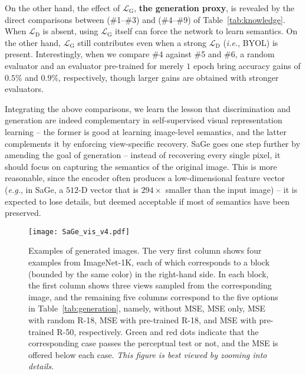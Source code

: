\documentclass[10pt,twocolumn,letterpaper]{article}
\begin{document}
On the other hand, the effect of $\mathcal{L}_\mathrm{G}$, \textbf{the generation proxy}, is revealed by the direct comparisons between (\#1--\#3) and (\#4--\#9) of Table~\ref{tab:knowledge}. When $\mathcal{L}_\mathrm{D}$ is absent, using $\mathcal{L}_\mathrm{G}$ itself can force the network to learn semantics. On the other hand, $\mathcal{L}_\mathrm{G}$ still contributes even when a strong $\mathcal{L}_\mathrm{D}$ (\textit{i.e.}, BYOL) is present. Interestingly, when we compare \#4 against \#5 and \#6, a random evaluator and an evaluator pre-trained for merely $1$ epoch bring accuracy gains of $0.5\%$ and $0.9\%$, respectively, though larger gains are obtained with stronger evaluators.

Integrating the above comparisons, we learn the lesson that discrimination and generation are indeed complementary in self-supervised visual representation learning -- the former is good at learning image-level semantics, and the latter complements it by enforcing view-specific recovery. SaGe goes one step further by amending the goal of generation -- instead of recovering every single pixel, it should focus on capturing the semantics of the original image. This is more reasonable, since the encoder often produces a low-dimensional feature vector (\textit{e.g.}, in SaGe, a $512$-D vector that is $294\times$ smaller than the input image) -- it is expected to lose details, but deemed acceptable if most of semantics have been preserved.

\begin{figure*}
\centering
\texttt{[image: SaGe\_vis\_v4.pdf]}
\caption{Examples of generated images. The very first column shows four examples from ImageNet-1K, each of which corresponds to a block (bounded by the same color) in the right-hand side. In each block, the first column shows three views sampled from the corresponding image, and the remaining five columns correspond to the five options in Table~\ref{tab:generation}, namely, without MSE, MSE only, MSE with random R-18, MSE with pre-trained R-18, and MSE with pre-trained R-50, respectively. Green and red dots indicate that the corresponding case passes the perceptual test or not, and the MSE is offered below each case. \textit{This figure is best viewed by zooming into details.}}
\label{fig:visualization}
\end{figure*}
\end{document}
